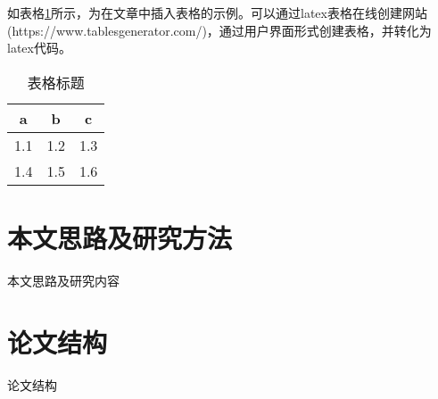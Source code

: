 如表格\ref{tb:table1}所示，为在文章中插入表格的示例。可以通过latex表格在线创建网站(https://www.tablesgenerator.com/)，通过用户界面形式创建表格，并转化为latex代码。

\begin{table}[]
	\caption{表格标题}
	\label{tb:table1}
	\centering
	\begin{tabular}{|c|c|c|}
		\hline
		a   & b   & c   \\ \hline
		1.1 & 1.2 & 1.3 \\ \hline
		1.4 & 1.5 & 1.6 \\ \hline
	\end{tabular}
\end{table}

\section{本文思路及研究方法}

本文思路及研究内容

\section{论文结构}

论文结构




